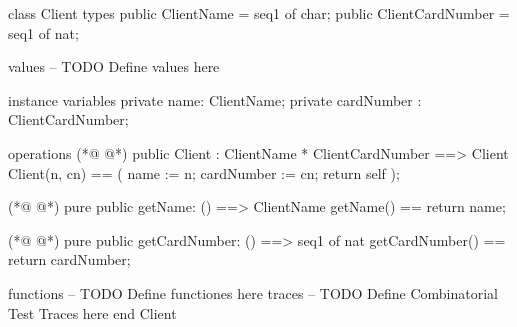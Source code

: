 \begin{vdmpp}[breaklines=true]
class Client
types
 public ClientName = seq1 of char;
 public ClientCardNumber = seq1 of nat;
 
values
-- TODO Define values here

instance variables
 private name: ClientName;
 private cardNumber : ClientCardNumber;
 
operations
(*@
\label{Client:14}
@*)
 public Client : ClientName * ClientCardNumber ==> Client
 Client(n, cn) == (
  name := n;
  cardNumber := cn;
  return self
 );
 
(*@
\label{getName:21}
@*)
 pure public getName: () ==> ClientName
 getName() == return name;
 
(*@
\label{getCardNumber:24}
@*)
 pure public getCardNumber: () ==> seq1 of nat
 getCardNumber() == return cardNumber;
 
functions
-- TODO Define functiones here
traces
-- TODO Define Combinatorial Test Traces here
end Client
\end{vdmpp}
